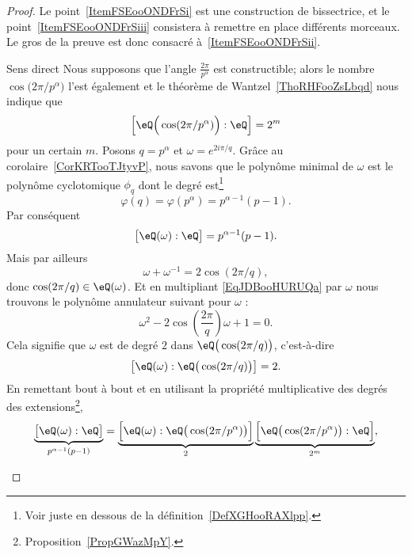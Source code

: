 \begin{proof}
	Le point~\ref{ItemFSEooONDFrSi} est une construction de bissectrice, et le point~\ref{ItemFSEooONDFrSiii} consistera à remettre en place différents morceaux. Le gros de la preuve est donc consacré à~\ref{ItemFSEooONDFrSii}.
	\begin{subproof}
		\item[Sens direct]
		Nous supposons que l'angle \( \frac{ 2\pi }{ p^{\alpha} }\) est constructible; alors le nombre \( \cos\big( 2\pi/p^{\alpha} \big)\) l'est également et le théorème de Wantzel~\ref{ThoRHFooZsLbqd} nous indique que
		\begin{equation}
			\left[ \eQ\Big( \cos(2\pi/p^{\alpha}) \Big):\eQ \right]=2^m
		\end{equation}
		pour un certain \( m\). Posons \( q=p^{\alpha}\) et \( \omega= e^{2i\pi/q}\). Grâce au corolaire~\ref{CorKRTooTJtyvP}, nous savons que le polynôme minimal de \( \omega\) est le polynôme cyclotomique \( \phi_q\) dont le
		degré est\footnote{Voir juste en dessous de la définition~\ref{DefXGHooRAXlpp}.}         %
		\begin{equation}
			\varphi(q)=\varphi(p^{\alpha})=p^{\alpha-1}(p-1).
		\end{equation}
		Par conséquent
		\begin{equation}
			\big[ \eQ(\omega):\eQ \big]=p^{\alpha-1}(p-1).
		\end{equation}
		Mais par ailleurs
		\begin{equation}    \label{EqJDBooHURUQa}
			\omega+\omega^{-1}=2\cos(2\pi/q),
		\end{equation}
		donc \( \cos(2\pi/q)\in \eQ(\omega)\). Et en multipliant \eqref{EqJDBooHURUQa} par \( \omega\) nous trouvons le polynôme annulateur suivant pour \( \omega\) :
		\begin{equation}
			\omega^2-2\cos\left( \frac{ 2\pi }{ q } \right)\omega+1=0.
		\end{equation}
		Cela signifie que \( \omega\) est de degré \( 2\) dans \( \eQ\big( \cos(2\pi/q) \big)\), c'est-à-dire
		\begin{equation}    \label{EqSJXooRCLJyt}
			\big[ \eQ(\omega):\eQ\big( \cos(2\pi/q) \big) \big]=2.
		\end{equation}
		En remettant bout à bout et en utilisant la propriété multiplicative des degrés des extensions\footnote{Proposition~\ref{PropGWazMpY}.},
		\begin{equation}
			\underbrace{\big[ \eQ(\omega):\eQ \big]}_{p^{\alpha-1}(p-1)}=\underbrace{\Big[ \eQ(\omega):\eQ\big( \cos(2\pi/p^{\alpha}) \big) \Big]}_{2}\underbrace{\Big[ \eQ\big( \cos(2\pi/p^{\alpha}) \big):\eQ \Big]}_{2^m},

\end{equation}
\end{subproof}
\end{proof}
